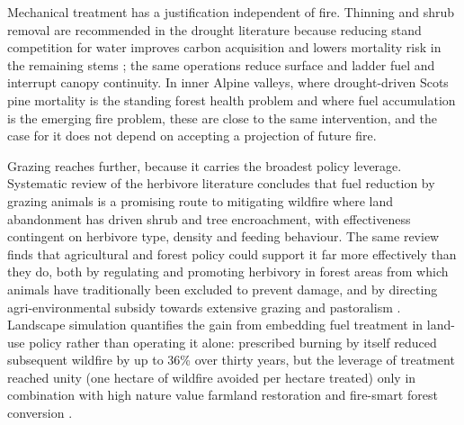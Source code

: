 \documentclass[11pt,a4paper]{article}
\begin{document}
Mechanical treatment has a justification independent of fire. Thinning and shrub removal are recommended in the drought literature because reducing stand competition for water improves carbon acquisition and lowers mortality risk in the remaining stems \citep{giuggiola_droughtinduced_2010}; the same operations reduce surface and ladder fuel and interrupt canopy continuity. In inner Alpine valleys, where drought-driven Scots pine mortality is the standing forest health problem and where fuel accumulation is the emerging fire problem, these are close to the same intervention, and the case for it does not depend on accepting a projection of future fire.

Grazing reaches further, because it carries the broadest policy leverage. Systematic review of the herbivore literature concludes that fuel reduction by grazing animals is a promising route to mitigating wildfire where land abandonment has driven shrub and tree encroachment, with effectiveness contingent on herbivore type, density and feeding behaviour. The same review finds that agricultural and forest policy could support it far more effectively than they do, both by regulating and promoting herbivory in forest areas from which animals have traditionally been excluded to prevent damage, and by directing agri-environmental subsidy towards extensive grazing and pastoralism \citep{rouetleduc_effects_2021}. Landscape simulation quantifies the gain from embedding fuel treatment in land-use policy rather than operating it alone: prescribed burning by itself reduced subsequent wildfire by up to 36\% over thirty years, but the leverage of treatment reached unity (one hectare of wildfire avoided per hectare treated) only in combination with high nature value farmland restoration and fire-smart forest conversion \citep{pais_optimizing_2023}.
\end{document}
